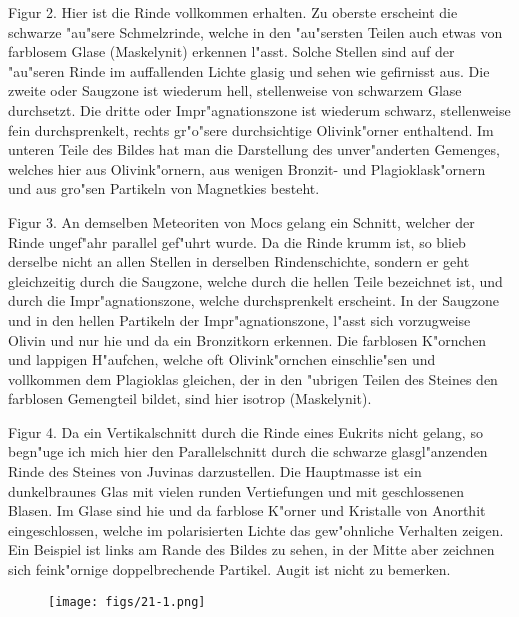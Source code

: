\documentclass[a4paper, 11pt, oneside, polutonikogreek, german]{article}
\begin{document}
Figur 2. Hier ist die Rinde vollkommen erhalten. Zu oberste erscheint die schwarze "au"sere Schmelzrinde, welche in den "au"sersten Teilen auch etwas von farblosem Glase (Maskelynit) erkennen l"asst. Solche Stellen sind auf der "au"seren Rinde im auffallenden Lichte glasig und sehen wie gefirnisst aus. Die zweite oder Saugzone ist wiederum hell, stellenweise von schwarzem Glase durchsetzt. Die dritte oder Impr"agnationszone ist wiederum schwarz, stellenweise fein durchsprenkelt, rechts gr"o"sere durchsichtige Olivink"orner enthaltend. Im unteren Teile des Bildes hat man die Darstellung des unver"anderten Gemenges, welches hier aus Olivink"ornern, aus wenigen Bronzit- und Plagioklask"ornern und aus gro"sen Partikeln von Magnetkies besteht.

Figur 3. An demselben Meteoriten von Mocs gelang ein Schnitt, welcher der Rinde ungef"ahr parallel gef"uhrt wurde. Da die Rinde krumm ist, so blieb derselbe nicht an allen Stellen in derselben Rindenschichte, sondern er geht gleichzeitig durch die Saugzone, welche durch die hellen Teile bezeichnet ist, und durch die Impr"agnationszone, welche durchsprenkelt erscheint. In der Saugzone und in den hellen Partikeln der Impr"agnationszone, l"asst sich vorzugweise Olivin und nur hie und da ein Bronzitkorn erkennen. Die farblosen K"ornchen und lappigen H"aufchen, welche oft Olivink"ornchen einschlie"sen und vollkommen dem Plagioklas gleichen, der in den "ubrigen Teilen des Steines den farblosen Gemengteil bildet, sind hier isotrop (Maskelynit).

Figur 4. Da ein Vertikalschnitt durch die Rinde eines Eukrits nicht gelang, so begn"uge ich mich hier den Parallelschnitt durch die schwarze glasgl"anzenden Rinde des Steines von Juvinas darzustellen. Die Hauptmasse ist ein dunkelbraunes Glas mit vielen runden Vertiefungen und mit geschlossenen Blasen. Im Glase sind hie und da farblose K"orner und Kristalle von Anorthit eingeschlossen, welche im polarisierten Lichte das gew"ohnliche Verhalten zeigen. Ein Beispiel ist links am Rande des Bildes zu sehen, in der Mitte aber zeichnen sich feink"ornige doppelbrechende Partikel. Augit ist nicht zu bemerken.
\clearpage

\vspace*{\fill}
\begin{figure}[H]
\centering
\texttt{[image: figs/21-1.png]}
\caption{}
\end{figure}
\vspace*{\fill}
\clearpage
\end{document}
